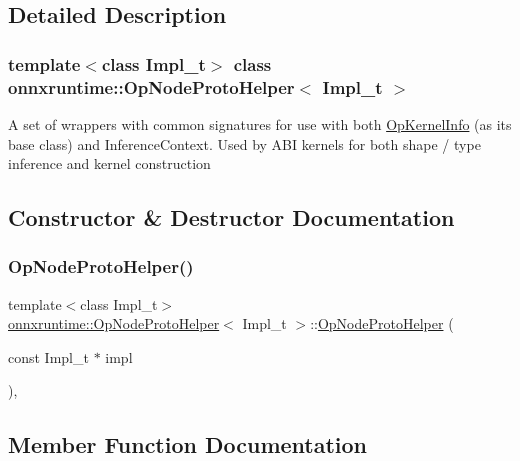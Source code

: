 \subsection{Detailed Description}
\subsubsection*{template$<$class Impl\+\_\+t$>$\newline
class onnxruntime\+::\+Op\+Node\+Proto\+Helper$<$ Impl\+\_\+t $>$}

A set of wrappers with common signatures for use with both \mbox{\hyperlink{classonnxruntime_1_1OpKernelInfo}{Op\+Kernel\+Info}} (as its base class) and Inference\+Context. Used by A\+BI kernels for both shape / type inference and kernel construction 

\subsection{Constructor \& Destructor Documentation}
\mbox{\label{classonnxruntime_1_1OpNodeProtoHelper_a7ebaae149b91605487008748a1d9bdbf}} 
\subsubsection{\texorpdfstring{Op\+Node\+Proto\+Helper()}{OpNodeProtoHelper()}}
{\footnotesize\ttfamily template$<$class Impl\+\_\+t$>$ \\
\mbox{\hyperlink{classonnxruntime_1_1OpNodeProtoHelper}{onnxruntime\+::\+Op\+Node\+Proto\+Helper}}$<$ Impl\+\_\+t $>$\+::\mbox{\hyperlink{classonnxruntime_1_1OpNodeProtoHelper}{Op\+Node\+Proto\+Helper}} (\begin{DoxyParamCaption}\item[{const Impl\+\_\+t $\ast$}]{impl }\end{DoxyParamCaption})\hspace{0.3cm}{\ttfamily [inline]}, {\ttfamily [explicit]}}



\subsection{Member Function Documentation}
\mbox{\label{classonnxruntime_1_1OpNodeProtoHelper_ac1cf3e77a444ae4b2b5ce34a56f5e4c9}} 
